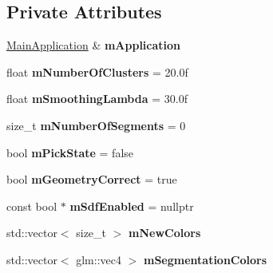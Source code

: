 \subsection*{Private Attributes}
\begin{DoxyCompactItemize}
\item 
\mbox{\label{classpepr3d_1_1_segmentation_ac2717aba7269a3eb01e1ec3c03331c17}} 
\mbox{\hyperlink{classpepr3d_1_1_main_application}{Main\+Application}} \& {\bfseries m\+Application}
\item 
\mbox{\label{classpepr3d_1_1_segmentation_a7097b3a93fea80b798e8e0117d4ab2a0}} 
float {\bfseries m\+Number\+Of\+Clusters} = 20.\+0f
\item 
\mbox{\label{classpepr3d_1_1_segmentation_a9b58e2e5f005ec47eb16cb65033b81ae}} 
float {\bfseries m\+Smoothing\+Lambda} = 30.\+0f
\item 
\mbox{\label{classpepr3d_1_1_segmentation_ac28116b16a089414c90acaa13e1b767d}} 
size\+\_\+t {\bfseries m\+Number\+Of\+Segments} = 0
\item 
\mbox{\label{classpepr3d_1_1_segmentation_a29b4f82176495128f046c4f5556b0ed0}} 
bool {\bfseries m\+Pick\+State} = false
\item 
\mbox{\label{classpepr3d_1_1_segmentation_af42e20289921819f50fcbc36d6e058f5}} 
bool {\bfseries m\+Geometry\+Correct} = true
\item 
\mbox{\label{classpepr3d_1_1_segmentation_ab119390cf1e8b5f5ba33d112a3a1806c}} 
const bool $\ast$ {\bfseries m\+Sdf\+Enabled} = nullptr
\item 
\mbox{\label{classpepr3d_1_1_segmentation_a4ce747a53afd47abaeff6f98070c8071}} 
std\+::vector$<$ size\+\_\+t $>$ {\bfseries m\+New\+Colors}
\item 
\mbox{\label{classpepr3d_1_1_segmentation_a4b71215638c39a9381fbd8980e65986c}} 
std\+::vector$<$ glm\+::vec4 $>$ {\bfseries m\+Segmentation\+Colors}

\end{DoxyCompactItemize}
